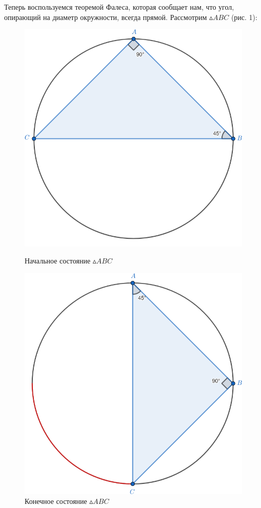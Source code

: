 \documentclass[a4paper]{article}
\begin{document}
Теперь воспользуемся теоремой Фалеса, которая сообщает нам, что угол, опирающий на диаметр окружности, всегда прямой. Рассмотрим $\vartriangle ABC$ (рис. 1):
\begin{figure}[H]
    \begin{minipage}{0.44\textwidth}
        \centering\includegraphics[width=\textwidth]{start.png}
        \caption{Начальное состояние $\vartriangle ABC$}
    \end{minipage}\hfill
    \begin{minipage}{0.44\textwidth}
        \centering\includegraphics[width=\textwidth]{finish.png}
        \caption{Конечное состояние $\vartriangle ABC$}
    \end{minipage}
\end{figure}
\end{document}
